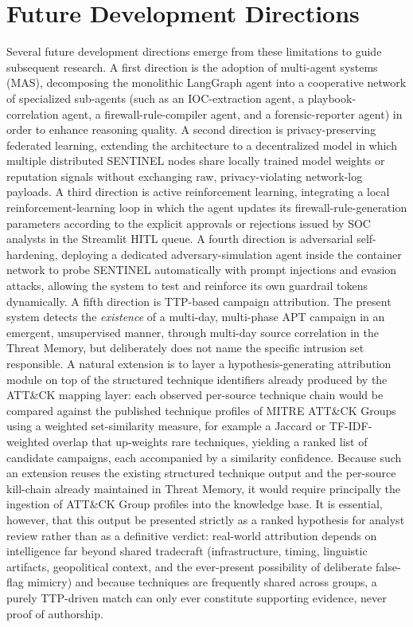\section{Future Development Directions}
Several future development directions emerge from these limitations to guide subsequent research. A first direction is the adoption of multi-agent systems (MAS), decomposing the monolithic LangGraph agent into a cooperative network of specialized sub-agents (such as an IOC-extraction agent, a playbook-correlation agent, a firewall-rule-compiler agent, and a forensic-reporter agent) in order to enhance reasoning quality. A second direction is privacy-preserving federated learning, extending the architecture to a decentralized model in which multiple distributed SENTINEL nodes share locally trained model weights or reputation signals without exchanging raw, privacy-violating network-log payloads. A third direction is active reinforcement learning, integrating a local reinforcement-learning loop in which the agent updates its firewall-rule-generation parameters according to the explicit approvals or rejections issued by SOC analysts in the Streamlit HITL queue. A fourth direction is adversarial self-hardening, deploying a dedicated adversary-simulation agent inside the container network to probe SENTINEL automatically with prompt injections and evasion attacks, allowing the system to test and reinforce its own guardrail tokens dynamically. A fifth direction is TTP-based campaign attribution. The present system detects the \emph{existence} of a multi-day, multi-phase APT campaign in an emergent, unsupervised manner, through multi-day source correlation in the Threat Memory, but deliberately does not name the specific intrusion set responsible. A natural extension is to layer a hypothesis-generating attribution module on top of the structured technique identifiers already produced by the ATT\&CK mapping layer: each observed per-source technique chain would be compared against the published technique profiles of MITRE ATT\&CK Groups using a weighted set-similarity measure, for example a Jaccard or TF-IDF-weighted overlap that up-weights rare techniques, yielding a ranked list of candidate campaigns, each accompanied by a similarity confidence. Because such an extension reuses the existing structured technique output and the per-source kill-chain already maintained in Threat Memory, it would require principally the ingestion of ATT\&CK Group profiles into the knowledge base. It is essential, however, that this output be presented strictly as a ranked hypothesis for analyst review rather than as a definitive verdict: real-world attribution depends on intelligence far beyond shared tradecraft (infrastructure, timing, linguistic artifacts, geopolitical context, and the ever-present possibility of deliberate false-flag mimicry) and because techniques are frequently shared across groups, a purely TTP-driven match can only ever constitute supporting evidence, never proof of authorship.

